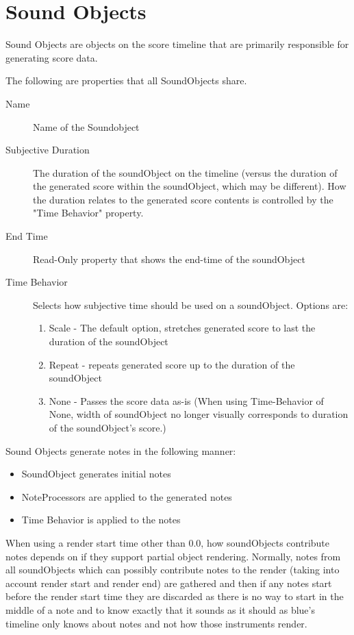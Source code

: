 \section{Sound Objects}\label{soundObjects}

Sound Objects are objects on the score timeline that are primarily
responsible for generating score data.

The following are properties that all SoundObjects share.

\begin{description}
\item[Name]
Name of the Soundobject
\item[Subjective Duration]
The duration of the soundObject on the timeline (versus the duration of
the generated score within the soundObject, which may be different). How
the duration relates to the generated score contents is controlled by
the "Time Behavior" property.
\item[End Time]
Read-Only property that shows the end-time of the soundObject
\item[Time Behavior]
Selects how subjective time should be used on a soundObject. Options
are:

\begin{enumerate}
\def\labelenumi{\arabic{enumi}.}
\item
  Scale - The default option, stretches generated score to last the
  duration of the soundObject
\item
  Repeat - repeats generated score up to the duration of the soundObject
\item
  None - Passes the score data as-is (When using Time-Behavior of None,
  width of soundObject no longer visually corresponds to duration of the
  soundObject's score.)
\end{enumerate}
\end{description}

Sound Objects generate notes in the following manner:

\begin{itemize}
\item
  SoundObject generates initial notes
\item
  NoteProcessors are applied to the generated notes
\item
  Time Behavior is applied to the notes
\end{itemize}

When using a render start time other than 0.0, how soundObjects
contribute notes depends on if they support partial object rendering.
Normally, notes from all soundObjects which can possibly contribute
notes to the render (taking into account render start and render end)
are gathered and then if any notes start before the render start time
they are discarded as there is no way to start in the middle of a note
and to know exactly that it sounds as it should as blue's timeline only
knows about notes and not how those instruments render.

